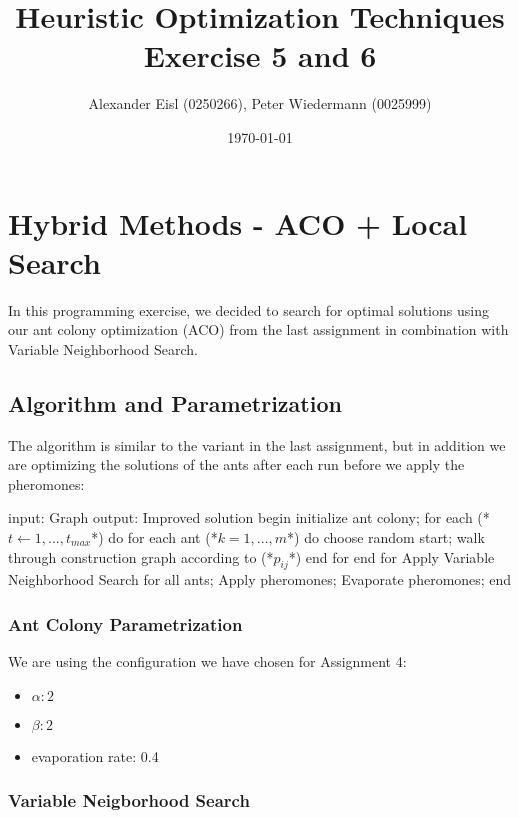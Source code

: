 \documentclass{scrartcl}
\author{Alexander Eisl (0250266), Peter Wiedermann (0025999)}
\date{\today}
\title{Heuristic Optimization Techniques \\ Exercise 5 and 6}
\begin{document}
\maketitle


\section{Hybrid Methods - ACO + Local Search}
\label{sec:hybdrin_methods}

In this programming exercise, we decided to search for optimal
solutions using our ant colony optimization (ACO) from the last assignment
in combination with Variable Neighborhood Search.

\subsection{Algorithm and Parametrization}

The algorithm is similar to the variant in the last assignment, but in
addition we are optimizing the solutions of
the ants after each run before we apply the pheromones:

\begin{algorithm}[caption={Ant Colony - VNS Hybrid}]
    input: Graph 
    output: Improved solution
    begin
        initialize ant colony;
        for each (*$t \leftarrow 1,...,t_{max}$*) do
      	    for each ant (*$k = 1,...,m$*) do
               choose random start;
               walk through construction graph according to (*$p_{ij}$*)
            end for
        end for
        Apply Variable Neighborhood Search for all ants;
        Apply pheromones;
        Evaporate pheromones;
    end
\end{algorithm}


\subsubsection{Ant Colony Parametrization}
\label{ant_colony}

We are using the configuration we have chosen for Assignment 4:
\begin{itemize}
\item $\alpha: 2 $
\item $\beta: 2$
\item evaporation rate: 0.4
\end{itemize}
\subsubsection{Variable Neigborhood Search}
\end{document}
